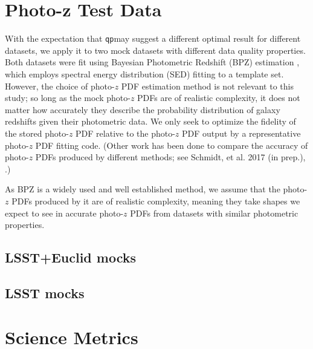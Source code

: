 \documentclass[\docopts]{\docclass}
\newcommand{\qp}{\texttt{qp}}
\begin{document}
\section{Photo-z Test Data}
\label{sec:data}

With the expectation that \qp may suggest a different optimal result for 
different datasets, we apply it to two mock datasets with different data 
quality properties.  Both datasets were fit using Bayesian Photometric Redshift 
(BPZ) estimation \citep{benitez_bayesian_2000}, which employs spectral energy 
distribution (SED) fitting to a template set.  However, the choice of photo-$z$ 
PDF estimation method is not relevant to this study; so long as the mock 
photo-$z$ PDFs are of realistic complexity, it does not matter how accurately 
they describe the probability distribution of galaxy redshifts given their 
photometric data.  We only seek to optimize the fidelity of the stored 
photo-$z$ PDF relative to the photo-$z$ PDF output by a representative 
photo-$z$ PDF fitting code.  (Other work has been done to compare the accuracy 
of photo-$z$ PDFs produced by different methods; see Schmidt, et al. 2017 (in 
prep.), \citet{tanaka_photometric_2017}.)

As BPZ is a widely used and well established method, we assume that the 
photo-$z$ PDFs produced by it are of realistic complexity, meaning they take 
shapes we expect to see in accurate photo-$z$ PDFs from datasets with similar 
photometric properties.

\subsection{LSST+Euclid mocks}
\label{sec:mg}


\subsection{LSST mocks}
\label{sec:ss}















\section{Science Metrics}
\label{sec:science}
\end{document}
